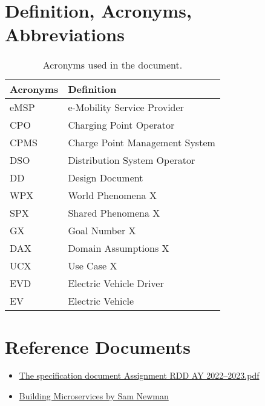 \section{Definition, Acronyms, Abbreviations}
\label{sec:definition_acronyms_abbreviations}%
\begin{table}[H]
    \begin{center}
        \begin{tabular}{ |l|l| }
            \hline
            \textbf{Acronyms} & \textbf{Definition}            \\
            \hline
            eMSP              & e-Mobility Service Provider    \\
            \hline
            CPO               & Charging Point Operator        \\
            \hline
            CPMS              & Charge Point Management System \\
            \hline
            DSO               & Distribution System Operator   \\
            \hline
            DD                & Design Document                \\
            \hline
            WPX               & World Phenomena X              \\
            \hline
            SPX               & Shared Phenomena X             \\
            \hline
            GX                & Goal Number X                  \\
            \hline
            DAX               & Domain Assumptions X           \\
            \hline
            UCX               & Use Case X                     \\
            \hline
            EVD               & Electric Vehicle Driver        \\
            \hline
            EV                & Electric Vehicle               \\
            \hline
        \end{tabular}
        \caption{Acronyms used in the document.}
        \label{tab:acronyms}%
    \end{center}
\end{table}


\section{Reference Documents}
\label{sec:reference_documents}%
\begin{itemize}
    \item \href{https://polimi365-my.sharepoint.com/:b:/g/personal/10685242_polimi_it/EWPABzzjfF9EsgYvSiuvdAIBAz6qnjdfLuPE8kwQSxeyCg?e=6qasKD}{The specification document Assignment RDD AY 2022--2023.pdf}
    \item \href{https://www.oreilly.com/library/view/building-microservices/9781491950340/}{Building Microservices by Sam Newman}
\end{itemize}


